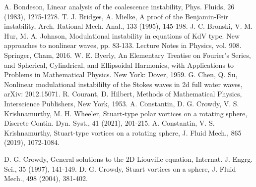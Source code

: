 \documentclass[1 [leqno, 11pt]{amsart}
\numberwithin{equation}{section}
\begin{document}
\begin{CJK*}{GBK}{song}
\begin{thebibliography}{99}
 A. Bondeson, Linear analysis of the coalescence instability,
 Phys. Fluids,  26  (1983), 1275-1278.
T. J. Bridges, A. Mielke,  A proof of the Benjamin-Feir instability, Arch. Rational Mech. Anal., 133 (1995),  145-198.
 J. C. Bronski, V. M. Hur, M. A. Johnson, Modulational instability in equations of
KdV type. New approaches to nonlinear waves, pp. 83-133. Lecture Notes in Physics,
vol. 908. Springer, Cham, 2016.
 W. E. Byerly,  An Elementary Treatise on Fourier's Series, and Spherical, Cylindrical, and Ellipsoidal Harmonics, with Applications to Problems in Mathematical Physics. New York: Dover, 1959.
   G. Chen, Q. Su, Nonlinear modulational instabililty of the Stokes waves in 2d full water
waves, arXiv: 2012.15071.
   R. Courant, D. Hilbert, Methods of Mathematical Physics, Interscience Publishers, New York, 1953.
 A. Constantin, D. G. Crowdy, V. S. Krishnamurthy, M. H. Wheeler,  Stuart-type polar vortices on a rotating sphere, Discrete Contin. Dyn. Syst., 41 (2021),  201-215.
 A. Constantin, V. S. Krishnamurthy,  Stuart-type vortices on a rotating sphere, J. Fluid Mech., 865 (2019), 1072-1084.

       D. G. Crowdy,  General solutions to the 2D Liouville equation, Internat. J. Engrg. Sci., 35 (1997), 141-149.
  D. G. Crowdy,  Stuart vortices on a sphere, J. Fluid Mech., 498 (2004), 381-402.




\end{thebibliography}
\end{CJK*}
\end{document}
